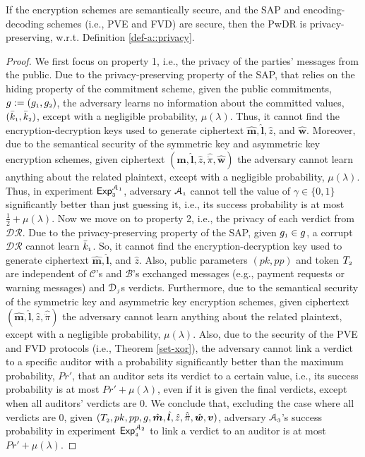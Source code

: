 \vspace{-2mm}
\begin{lemma}\label{lemma::privacy}
If the encryption schemes are semantically secure, and the SAP and encoding-decoding schemes (i.e., PVE and FVD)  are secure, then the PwDR is privacy-preserving, w.r.t.  Definition \ref{def-a::privacy}.  
\end{lemma}

% 
\vspace{-4mm}
\begin{proof}
We first focus on property 1, i.e., the privacy of the parties' messages from the public.  Due to the privacy-preserving property of the SAP, that relies  on the hiding property of the commitment scheme, given the public commitments, $g:=(g_{\scriptscriptstyle 1}, g_{\scriptscriptstyle 2})$,  the adversary learns no information about the
committed values, $(\bar k_{\scriptscriptstyle 1}, \bar k_{\scriptscriptstyle 2})$, except with a negligible probability, $\mu(\lambda)$. Thus, it cannot find the encryption-decryption keys used to generate ciphertext  $\hat {\bm m}, \hat{\bm l}, \hat z$, and  $\hat{\bm{w}}$. Moreover, due to the semantical security of the symmetric key and asymmetric key encryption schemes,  given ciphertext $(\hat {\bm m}, \hat{\bm l}, \hat z, \hat{\ddot \pi}, \hat{\bm{w}})$ the adversary cannot learn anything  about the related plaintext, except with a negligible probability, $\mu(\lambda)$. Thus, in experiment  $\mathsf{Exp}_{\scriptscriptstyle 3}^{\mathcal{A}_{\scriptscriptstyle 1}}$,  adversary $\mathcal{A}_{\scriptscriptstyle 1}$ cannot tell the value of $\gamma\in \{0, 1\}$ significantly better than just guessing it, i.e., its success probability is at most $\frac{1}{2}+\mu(\lambda)$. Now we move on to property 2, i.e., the privacy of each verdict from $\mathcal{DR}$. Due to the privacy-preserving property of the SAP, given $g_{\scriptscriptstyle 1}\in g$, a corrupt $\mathcal{DR}$ cannot learn  $\bar k_{\scriptscriptstyle 1}$. So,  it cannot find the encryption-decryption key used to generate ciphertext  $\hat {\bm m}, \hat{\bm l}$, and $\hat z$. Also, public parameters $(pk,pp)$ and token $T_{\scriptscriptstyle 2}$ are independent of $\mathcal{C}$'s and $\mathcal{B}$'s exchanged messages (e.g., payment requests or warning messages)  and $\mathcal{D}_{\scriptscriptstyle j}$s  verdicts. Furthermore, due to  the semantical security of the symmetric key and asymmetric key encryption schemes,  given ciphertext $(\hat {\bm m}, \hat{\bm l}, \hat z, \hat{\ddot \pi})$ the adversary cannot learn anything  about the related plaintext, except with a negligible probability, $\mu(\lambda)$. Also, due to the security of the  PVE and FVD protocols (i.e., Theorem \ref{set-xor}), the adversary cannot link a verdict to a specific auditor with a probability significantly better than the maximum probability, $Pr'$, that an auditor sets its verdict to a certain value, i.e., its success probability is at most $Pr'+\mu(\lambda)$, even if it is given the final verdicts, except when all auditors' verdicts are $0$. We conclude that, excluding the case where  all verdicts are $0$, given $(T_{\scriptscriptstyle 2}, pk, pp, g, \hat{\bm m}, \hat{\bm l},  \hat z, \hat{\ddot \pi}, \hat{\bm{w}}, \bm v)$,   adversary $\mathcal{A}_{\scriptscriptstyle 3}$'s success probability in experiment $\mathsf{Exp}_{\scriptscriptstyle 4}^{\mathcal{A}_{\scriptscriptstyle 2}}$ to link a verdict to an auditor is at most $Pr'+\mu(\lambda)$. 

\end{proof}
